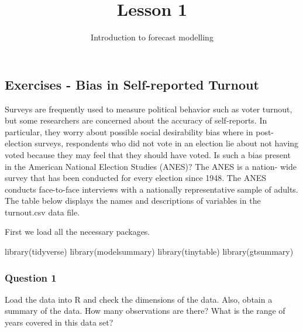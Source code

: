 \documentclass[
  letterpaper,
  DIV=11,
  numbers=noendperiod]{scrartcl}
\title{Lesson 1}
\subtitle{Introduction to forecast modelling}
\author{}
\date{}
\newenvironment{Shaded}{\begin{snugshade}}{\end{snugshade}}
\newcommand{\FunctionTok}[1]{\textcolor[rgb]{0.28,0.35,0.67}{#1}}
\newcommand{\NormalTok}[1]{\textcolor[rgb]{0.00,0.23,0.31}{#1}}
\begin{document}
\maketitle


\subsection{Exercises - Bias in Self-reported
Turnout}\label{exercises---bias-in-self-reported-turnout}

Surveys are frequently used to measure political behavior such as voter
turnout, but some researchers are concerned about the accuracy of
self-reports. In particular, they worry about possible social
desirability bias where in post-election surveys, respondents who did
not vote in an election lie about not having voted because they may feel
that they should have voted. Is such a bias present in the American
National Election Studies (ANES)? The ANES is a nation- wide survey that
has been conducted for every election since 1948. The ANES conducts
face-to-face interviews with a nationally representative sample of
adults. The table below displays the names and descriptions of variables
in the turnout.csv data file.

First we load all the necessary packages.

\begin{Shaded}
\begin{Highlighting}[]
\FunctionTok{library}\NormalTok{(tidyverse)}
\FunctionTok{library}\NormalTok{(modelsummary)}
\FunctionTok{library}\NormalTok{(tinytable)}
\FunctionTok{library}\NormalTok{(gtsummary)}
\end{Highlighting}
\end{Shaded}

\subsubsection{Question 1}\label{question-1}

Load the data into R and check the dimensions of the data. Also, obtain
a summary of the data. How many observations are there? What is the
range of years covered in this data set?
\end{document}
